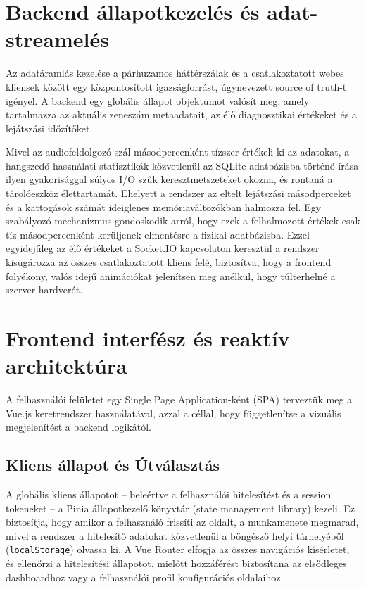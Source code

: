\documentclass[12pt,a4paper,hungarian]{report}
\begin{document}
\section{Backend állapotkezelés és adat-streamelés}

Az adatáramlás kezelése a párhuzamos háttérszálak és a csatlakoztatott webes kliensek között egy központosított igazságforrást, úgynevezett source of truth-t igényel. A backend egy globális állapot objektumot valósít meg, amely tartalmazza az aktuális zeneszám metaadatait, az élő diagnosztikai értékeket és a lejátszási időzítőket.

Mivel az audiofeldolgozó szál másodpercenként tízszer értékeli ki az adatokat, a hangszedő-használati statisztikák közvetlenül az SQLite adatbázisba történő írása ilyen gyakorisággal súlyos I/O szűk keresztmetszeteket okozna, és rontaná a tárolóeszköz élettartamát. Ehelyett a rendszer az eltelt lejátszási másodperceket és a kattogások számát ideiglenes memóriaváltozókban halmozza fel. Egy szabályozó mechanizmus gondoskodik arról, hogy ezek a felhalmozott értékek csak tíz másodpercenként kerüljenek elmentésre a fizikai adatbázisba. Ezzel egyidejűleg az élő értékeket a Socket.IO kapcsolaton keresztül a rendszer kisugározza az összes csatlakoztatott kliens felé, biztosítva, hogy a frontend folyékony, valós idejű animációkat jelenítsen meg anélkül, hogy túlterhelné a szerver hardverét.

\section{Frontend interfész és reaktív architektúra}

A felhasználói felületet egy Single Page Application-ként (SPA) terveztük meg a Vue.js keretrendszer használatával, azzal a céllal, hogy függetlenítse a vizuális megjelenítést a backend logikától.

\subsection{Kliens állapot és Útválasztás}
A globális kliens állapotot – beleértve a felhasználói hitelesítést és a session tokeneket – a Pinia állapotkezelő könyvtár (state management library) kezeli. Ez biztosítja, hogy amikor a felhasználó frissíti az oldalt, a munkamenete megmarad, mivel a rendszer a hitelesítő adatokat közvetlenül a böngésző helyi tárhelyéből (\texttt{localStorage}) olvassa ki. A Vue Router elfogja az összes navigációs kísérletet, és ellenőrzi a hitelesítési állapotot, mielőtt hozzáférést biztosítana az elsődleges dashboardhoz vagy a felhasználói profil konfigurációs oldalaihoz.
\end{document}
